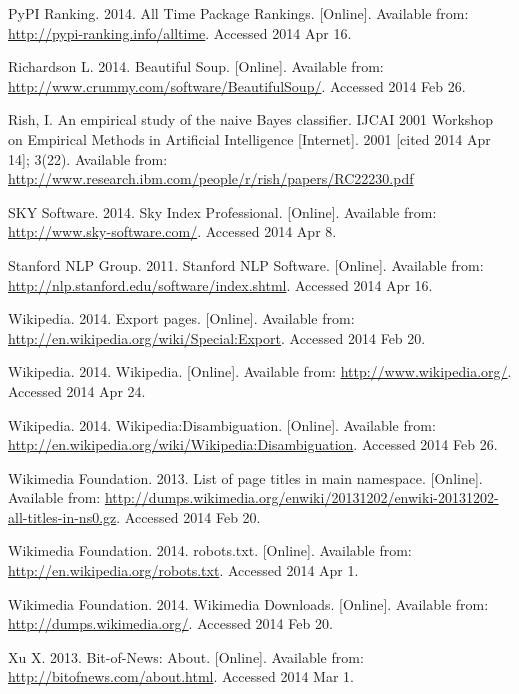 \begin{thebibliography}{99}
PyPI Ranking. 2014. All Time Package Rankings. [Online]. Available from: \url{http://pypi-ranking.info/alltime}. Accessed 2014 Apr 16.

Richardson L. 2014. Beautiful Soup. [Online]. Available from: \url{http://www.crummy.com/software/BeautifulSoup/}. Accessed 2014 Feb 26.

Rish, I. An empirical study of the naive Bayes classifier. IJCAI 2001 Workshop on Empirical Methods in Artificial Intelligence [Internet]. 2001 [cited 2014 Apr 14]; 3(22). Available from: \url{http://www.research.ibm.com/people/r/rish/papers/RC22230.pdf}

SKY Software. 2014. Sky Index Professional. [Online]. Available from: \url{http://www.sky-software.com/}. Accessed 2014 Apr 8.

Stanford NLP Group. 2011. Stanford NLP Software. [Online]. Available from: \url{http://nlp.stanford.edu/software/index.shtml}. Accessed 2014 Apr 16.

Wikipedia. 2014. Export pages. [Online]. Available from: \url{http://en.wikipedia.org/wiki/Special:Export}. Accessed 2014 Feb 20.

Wikipedia. 2014. Wikipedia. [Online]. Available from: \url{http://www.wikipedia.org/}. Accessed 2014 Apr 24.

Wikipedia. 2014. Wikipedia:Disambiguation. [Online]. Available from: \url{http://en.wikipedia.org/wiki/Wikipedia:Disambiguation}. Accessed 2014 Feb 26.

Wikimedia Foundation. 2013. List of page titles in main namespace. [Online]. Available from: \url{http://dumps.wikimedia.org/enwiki/20131202/enwiki-20131202-all-titles-in-ns0.gz}. Accessed 2014 Feb 20.

Wikimedia Foundation. 2014. robots.txt. [Online]. Available from: \url{http://en.wikipedia.org/robots.txt}. Accessed 2014 Apr 1.

Wikimedia Foundation. 2014. Wikimedia Downloads. [Online]. Available from: \url{http://dumps.wikimedia.org/}. Accessed 2014 Feb 20.

Xu X. 2013. Bit-of-News: About. [Online]. Available from: \url{http://bitofnews.com/about.html}. Accessed 2014 Mar 1.

\end{thebibliography}